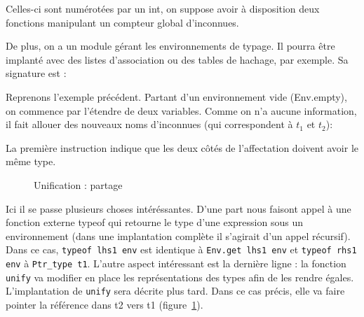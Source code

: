 Celles-ci sont numérotées par un int, on suppose avoir à disposition deux
fonctions manipulant un compteur global d'inconnues.


De plus, on a un module gérant les environnements de typage. Il pourra être
implanté avec des listes d'association ou des tables de hachage, par exemple. Sa
signature est :


Reprenons l'exemple précédent. Partant d'un environnement vide (Env.empty), on
commence par l'étendre de deux variables. Comme on n'a aucune information, il
fait allouer des nouveaux noms d'inconnues (qui correspondent à $t_1$ et $t_2$):


La première instruction indique que les deux côtés de l'affectation doivent
avoir le même type.


\begin{figure}
  \centering
  \caption{Unification : partage}
  \label{fig:unifsharing}
\end{figure}

Ici il se passe plusieurs choses intéréssantes. D'une part nous faisont appel à
une fonction externe typeof qui retourne le type d'une expression sous un
environnement (dans une implantation complète il s'agirait d'un appel récursif).
Dans ce cas, \texttt{typeof lhs1 env} est identique à \texttt{Env.get lhs1 env}
et \texttt{typeof rhs1 env} à \texttt{Ptr\_type t1}. L'autre aspect intéressant
est la dernière ligne : la fonction \texttt{unify} va modifier en place les
représentations des types afin de les rendre égales. L'implantation de
\texttt{unify} sera décrite plus tard. Dans ce cas précis, elle va faire pointer
la référence dans t2 vers t1 (figure~\ref{fig:unifsharing}).

